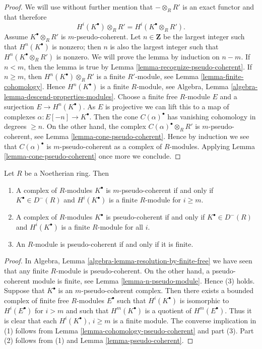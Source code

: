 \begin{proof}
We will use without further mention that $- \otimes_R R'$ is
an exact functor and that therefore
$$
H^i(K^\bullet) \otimes_R R' = H^i(K^\bullet \otimes_R R').
$$
Assume $K^\bullet \otimes_R R'$ is $m$-pseudo-coherent.
Let $n \in \mathbf{Z}$ be the largest integer such that
$H^n(K^\bullet)$ is nonzero; then $n$ is also the largest integer
such that $H^n(K^\bullet \otimes_R R')$ is nonzero.
We will prove the lemma by induction on $n - m$.
If $n < m$, then the lemma is true by
Lemma \ref{lemma-recognize-pseudo-coherent}.
If $n \geq m$, then $H^n(K^\bullet) \otimes_R R'$ is a finite
$R'$-module, see
Lemma \ref{lemma-finite-cohomology}.
Hence $H^n(K^\bullet)$ is a finite $R$-module, see
Algebra, Lemma \ref{algebra-lemma-descend-properties-modules}.
Choose a finite free $R$-module $E$ and a surjection $E \to H^n(K^\bullet)$.
As $E$ is projective we can lift this to a map of complexes
$\alpha : E[-n] \to K^\bullet$. Then the cone $C(\alpha)^\bullet$ has
vanishing cohomology in degrees $\geq n$. On the other hand, the
complex $C(\alpha)^\bullet \otimes_R R'$ is $m$-pseudo-coherent, see
Lemma \ref{lemma-cone-pseudo-coherent}.
Hence by induction we see that $C(\alpha)^\bullet$ is $m$-pseudo-coherent
as a complex of $R$-modules. Applying
Lemma \ref{lemma-cone-pseudo-coherent}
once more we conclude.
\end{proof}

\begin{lemma}
\label{lemma-Noetherian-pseudo-coherent}
Let $R$ be a Noetherian ring. Then
\begin{enumerate}
\item A complex of $R$-modules $K^\bullet$ is $m$-pseudo-coherent
if and only if $K^\bullet \in D^{-}(R)$ and
$H^i(K^\bullet)$ is a finite $R$-module for $i \geq m$.
\item A complex of $R$-modules $K^\bullet$ is pseudo-coherent
if and only if $K^\bullet \in D^{-}(R)$ and
$H^i(K^\bullet)$ is a finite $R$-module for all $i$.
\item An $R$-module is pseudo-coherent if and only if it is finite.
\end{enumerate}
\end{lemma}

\begin{proof}
In
Algebra, Lemma \ref{algebra-lemma-resolution-by-finite-free}
we have seen that any finite $R$-module is pseudo-coherent.
On the other hand, a pseudo-coherent module is finite, see
Lemma \ref{lemma-n-pseudo-module}.
Hence (3) holds. Suppose that $K^\bullet$ is an $m$-pseudo-coherent complex.
Then there exists a bounded complex of finite free $R$-modules $E^\bullet$
such that $H^i(K^\bullet)$ is isomorphic to $H^i(E^\bullet)$ for
$i > m$ and such that $H^m(K^\bullet)$ is a quotient of $H^m(E^\bullet)$.
Thus it is clear that each $H^i(K^\bullet)$, $i \geq m$ is a finite module.
The converse implication in (1) follows from
Lemma \ref{lemma-cohomology-pseudo-coherent}
and part (3).
Part (2) follows from (1) and
Lemma \ref{lemma-pseudo-coherent}.
\end{proof}

